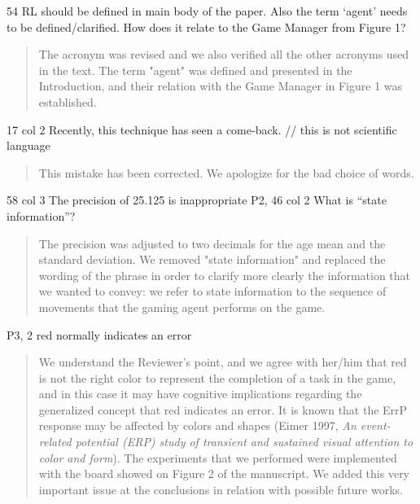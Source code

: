 \documentclass[journal,onecolumn,12pt]{IEEEtran}
\begin{document}
54 RL should be defined in main body of the paper. Also the term ‘agent’ needs to be defined/clarified. How does it relate to the Game Manager from Figure 1?

\vspace{2em}
\begin{quotation}
{\color{blue}
The acronym was revised and we also verified all the other acronyms used in the text.  The term "agent" was defined and presented in the Introduction, and their relation with the Game Manager in Figure 1 was established.
}
\end{quotation}
\vspace{2em}

17 col 2 Recently, this technique has seen a come-back. // this is not scientific language

\vspace{2em}
\begin{quotation}
{\color{blue}
This mistake has been corrected.  We apologize for the bad choice of words.
}
\end{quotation}
\vspace{2em}

58 col 3 The precision of 25.125 is inappropriate P2, 46 col 2 What is “state information”?

\vspace{2em}
\begin{quotation}
{\color{blue}
The precision was adjusted to two decimals for the age mean and the standard deviation.  We removed  "state information" and replaced the wording of the phrase in order to clarify more clearly the information that we wanted to convey:  we refer to state information to the sequence of movements that the gaming agent performs on the game.
}
\end{quotation}
\vspace{2em}

P3, 2 red normally indicates an error

\vspace{2em}
\begin{quotation}
{\color{blue}
We understand the Reviewer's point, and we agree with her/him that red is not the right color to represent the completion of a task in the game, and in this case it may have cognitive implications regarding the generalized concept that red indicates an error.   It is known that the ErrP response may be affected by colors and shapes (Eimer 1997, \textit{An event-related potential (ERP) study of transient and sustained visual attention to color and form}).  The experiments that we performed were implemented with the board showed on Figure 2 of the manuscript.  We added this very important issue at the conclusions in relation with possible future works.
}
\end{quotation}
\vspace{2em}
\end{document}
